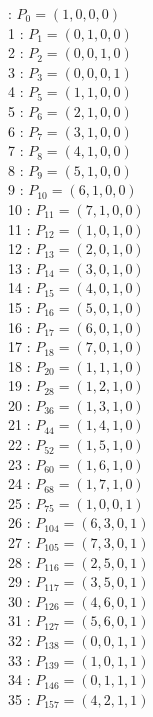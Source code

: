 \documentclass{article}
\begin{document}
{\begin{multicols}{3}
 : $P_{0}=( 1, 0, 0, 0 )$\\
1 : $P_{1}=( 0, 1, 0, 0 )$\\
2 : $P_{2}=( 0, 0, 1, 0 )$\\
3 : $P_{3}=( 0, 0, 0, 1 )$\\
4 : $P_{5}=( 1, 1, 0, 0 )$\\
5 : $P_{6}=( 2, 1, 0, 0 )$\\
6 : $P_{7}=( 3, 1, 0, 0 )$\\
7 : $P_{8}=( 4, 1, 0, 0 )$\\
8 : $P_{9}=( 5, 1, 0, 0 )$\\
9 : $P_{10}=( 6, 1, 0, 0 )$\\
10 : $P_{11}=( 7, 1, 0, 0 )$\\
11 : $P_{12}=( 1, 0, 1, 0 )$\\
12 : $P_{13}=( 2, 0, 1, 0 )$\\
13 : $P_{14}=( 3, 0, 1, 0 )$\\
14 : $P_{15}=( 4, 0, 1, 0 )$\\
15 : $P_{16}=( 5, 0, 1, 0 )$\\
16 : $P_{17}=( 6, 0, 1, 0 )$\\
17 : $P_{18}=( 7, 0, 1, 0 )$\\
18 : $P_{20}=( 1, 1, 1, 0 )$\\
19 : $P_{28}=( 1, 2, 1, 0 )$\\
20 : $P_{36}=( 1, 3, 1, 0 )$\\
21 : $P_{44}=( 1, 4, 1, 0 )$\\
22 : $P_{52}=( 1, 5, 1, 0 )$\\
23 : $P_{60}=( 1, 6, 1, 0 )$\\
24 : $P_{68}=( 1, 7, 1, 0 )$\\
25 : $P_{75}=( 1, 0, 0, 1 )$\\
26 : $P_{104}=( 6, 3, 0, 1 )$\\
27 : $P_{105}=( 7, 3, 0, 1 )$\\
28 : $P_{116}=( 2, 5, 0, 1 )$\\
29 : $P_{117}=( 3, 5, 0, 1 )$\\
30 : $P_{126}=( 4, 6, 0, 1 )$\\
31 : $P_{127}=( 5, 6, 0, 1 )$\\
32 : $P_{138}=( 0, 0, 1, 1 )$\\
33 : $P_{139}=( 1, 0, 1, 1 )$\\
34 : $P_{146}=( 0, 1, 1, 1 )$\\
35 : $P_{157}=( 4, 2, 1, 1 )$\\

\end{multicols}}
\end{document}
